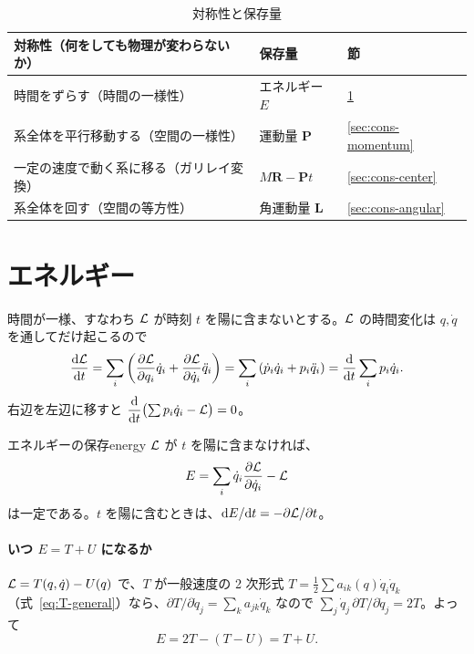 \begin{table}[htbp]
\centering
\caption{対称性と保存量}\label{tab:symmetry-map}
\begin{tabularx}{\linewidth}{@{}Lll@{}}
\toprule
対称性（何をしても物理が変わらないか） & 保存量 & 節 \\
\midrule
時間をずらす（時間の一様性） & エネルギー $E$ & \ref{sec:cons-energy} \\
系全体を平行移動する（空間の一様性） & 運動量 $\bm P$ & \ref{sec:cons-momentum} \\
一定の速度で動く系に移る（ガリレイ変換） & $M\bm R-\bm Pt$ & \ref{sec:cons-center} \\
系全体を回す（空間の等方性） & 角運動量 $\bm L$ & \ref{sec:cons-angular} \\
\bottomrule
\end{tabularx}
\end{table}

\section{エネルギー}\label{sec:cons-energy}

時間が一様、すなわち $\mathcal{L}$ が時刻 $t$ を陽に含まないとする。$\mathcal{L}$ の時間変化は
$q,\dot q$ を通してだけ起こるので
\begin{equation}
  \frac{\mathrm{d} \mathcal{L}}{\mathrm{d} t}=\sum_i\left(\frac{\partial \mathcal{L}}{\partial q_i}\dot q_i+\frac{\partial \mathcal{L}}{\partial \dot q_i}\ddot q_i\right)
  =\sum_i\left(\dot p_i\dot q_i+p_i\ddot q_i\right)=\frac{\mathrm{d} }{\mathrm{d} t}\sum_ip_i\dot q_i .
\end{equation}
右辺を左辺に移すと $\dfrac{\mathrm{d}}{\mathrm{d} t}\bigl(\sum p_i\dot q_i-\mathcal{L}\bigr)=0$。

\begin{result}{エネルギーの保存}{energy}
$\mathcal{L}$ が $t$ を陽に含まなければ、
\begin{equation}
  E=\sum_i\dot q_i\frac{\partial \mathcal{L}}{\partial \dot q_i}-\mathcal{L}
  \label{eq:energy-function}
\end{equation}
は一定である。$t$ を陽に含むときは、$\mathrm{d} E/\mathrm{d} t=-\partial\mathcal{L}/\partial t$。
\end{result}

\paragraph{いつ $E=T+U$ になるか}
$\mathcal{L}=T(q,\dot q)-U(q)$ で、$T$ が一般速度の 2 次形式 $T=\tfrac12\sum a_{ik}(q)\dot q_i\dot q_k$
（式~\eqref{eq:T-general}）なら、$\partial T/\partial\dot q_j=\sum_ka_{jk}\dot q_k$ なので
$\sum_j\dot q_j\,\partial T/\partial\dot q_j=2T$。よって
\begin{equation}
  E=2T-(T-U)=T+U .
\end{equation}


